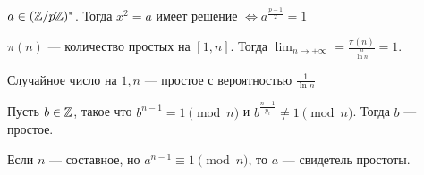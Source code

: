 \begin{theorem}
    $a \in (\mathbb{Z} / p \mathbb{Z})^*$. Тогда  $x^2 = a$ имеет решение  $\iff a^{\frac{p-1}{2}} = 1$
\end{theorem}
 \begin{theorem}
     $\pi(n)$ --- количество простых на  $[1, n]$. Тогда  $\lim_{n \to +\infty} = \frac{\pi(n)}{\frac{n}{\ln n}} = 1$.
\end{theorem}
\begin{consequence}
   Случайное число на $1, n$ --- простое с вероятностью  $\frac{1}{\ln n}$ 
\end{consequence}
\begin{theorem}
Пусть  $b \in \mathbb{Z}$, такое что  $b^{n-1}= 1 \pmod{n}$ и  $b^{\frac{n-1}{p_i}} \neq 1 \pmod{n}$. Тогда $b$ --- простое.
\end{theorem}
 \begin{definition}
     Если $n$ --- составное, но  $a^{n-1} \equiv 1 \pmod{n}$, то  $a$ --- свидетель простоты.
\end{definition}
